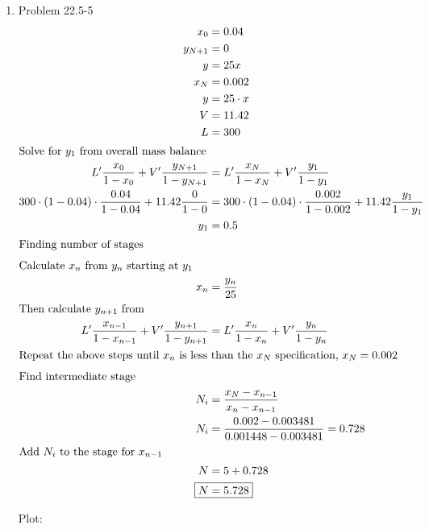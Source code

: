 \documentclass[12pt]{article}
\begin{document}
\begin{enumerate}
\newpage
    \item Problem 22.5-5
    \begin{align*}
        x_0 &= 0.04 \\
        y_{N+1} &= 0 \\
        y &= 25x \\
        x_N &= 0.002 \\
        y &= 25 \cdot x \\
        V &= 11.42 \\
        L &= 300 \\
        \intertext{Solve for $y_1$ from overall mass balance}
        L' \frac{x_0}{1-x_0} + V' \frac{y_{N+1}}{1-y_{N+1}} &= L' \frac{x_N}{1-x_N} + V' \frac{y_1}{1-y_1} \\
        300 \cdot (1 - 0.04) \cdot \frac{0.04}{1-0.04} + 11.42 \frac{0}{1-0} &= 300 \cdot (1 - 0.04) \cdot \frac{0.002}{1-0.002} + 11.42 \frac{y_1}{1-y_1} \\
        y_1 &= 0.5 \\
        \intertext{Finding number of stages}
        \intertext{Calculate $x_n$ from $y_n$ starting at $y_1$}
        x_n &= \frac{y_n}{25} \\
        \intertext{Then calculate $y_{n+1}$ from}
        L' \frac{x_{n-1}}{1-x_{n-1}} + V' \frac{y_{n+1}}{1-y_{n+1}} &= L' \frac{x_n}{1-x_n} + V' \frac{y_n}{1-y_n} \\
        \intertext{Repeat the above steps until $x_n$ is less than the $x_N$ specification, $x_N=0.002$}
        \intertext{Find intermediate stage}
        N_i &= \frac{x_N - x_{n-1}}{x_{n} - x_{n-1}} \\
        N_i &= \frac{0.002 - 0.003481}{0.001448 - 0.003481} = 0.728\\
        \intertext{Add $N_i$ to the stage for $x_{n-1}$}
        N &= 5 + 0.728 \\
        \Aboxed{N &= 5.728}
    \end{align*}

    Plot:

    


\end{enumerate}
\end{document}
